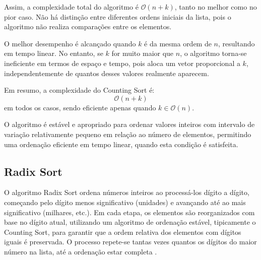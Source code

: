 \documentclass[conference]{IEEEtran}
\begin{document}
Assim, a complexidade total do algoritmo é \(\mathcal{O}(n + k)\), tanto no melhor como no pior caso. Não há distinção entre diferentes ordens iniciais da lista, pois o algoritmo não realiza comparações entre os elementos.

O melhor desempenho é alcançado quando \( k \) é da mesma ordem de \( n \), resultando em tempo linear. No entanto, se \( k \) for muito maior que \( n \), o algoritmo torna-se ineficiente em termos de espaço e tempo, pois aloca um vetor proporcional a \( k \), independentemente de quantos desses valores realmente aparecem.

Em resumo, a complexidade do Counting Sort é:
\[
\mathcal{O}(n + k)
\]
em todos os casos, sendo eficiente apenas quando \( k \in \mathcal{O}(n) \).

O algoritmo é estável e apropriado para ordenar valores inteiros com intervalo de variação relativamente pequeno em relação ao número de elementos, permitindo uma ordenação eficiente em tempo linear, quando esta condição é satisfeita.

\subsection{Radix Sort}

O algoritmo Radix Sort ordena números inteiros ao processá-los dígito a dígito, começando pelo dígito menos significativo (unidades) e avançando até ao mais significativo (milhares, etc.). Em cada etapa, os elementos são reorganizados com base no dígito atual, utilizando um algoritmo de ordenação estável, tipicamente o Counting Sort, para garantir que a ordem relativa dos elementos com dígitos iguais é preservada. O processo repete-se tantas vezes quantos os dígitos do maior número na lista, até a ordenação estar completa \cite{obeya2019parallel}.
\end{document}
